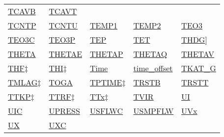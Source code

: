 \documentclass[
  english,
]{book}
\begin{document}
\begin{longtable}[]{@{}lllll@{}}
\href{./radiation-variables.html\#rstx}{TCAVB} &
\href{./radiation-variables.html\#rstx}{TCAVT} \\
\href{./aerosol-particle-measurements.html\#tcntu-tcntp}{TCNTP} &
\href{./aerosol-particle-measurements.html\#tcntu-tcntp}{TCNTU} &
\href{./aerosol-particle-measurements.html\#cntemp}{TEMP1} &
\href{./aerosol-particle-measurements.html\#cntemp}{TEMP2} &
\href{./air-chemistry-measurements.html\#te03}{TEO3} \\
\href{./air-chemistry-measurements.html\#te03c}{TEO3C} &
\href{./air-chemistry-measurements.html\#tep}{TEO3P} &
\href{./air-chemistry-measurements.html\#tep}{TEP} &
\href{./air-chemistry-measurements.html\#tet}{TET} &
\href{./the-state-of-the-aircraft.html\#thdg}{THDG}{]} \\
\href{./the-state-of-the-atmosphere.html\#theta}{THETA} &
\href{./the-state-of-the-atmosphere.html\#thetae}{THETAE} &
\href{./the-state-of-the-atmosphere.html\#thetae}{THETAP} &
\href{./the-state-of-the-atmosphere.html\#thetaq}{THETAQ} &
\href{./the-state-of-the-atmosphere.html\#thetav}{THETAV} \\
\href{./obsolete-variables.html\#thf}{THF\(\ddagger\)} &
\href{./obsolete-variables.html\#ltn51}{THI\(\ddagger\)} &
\href{./general-information-about-data-files.html\#time}{Time} &
\href{./general-information-about-data-files.html\#time-offset}{time\_offset}
& \href{./the-state-of-the-aircraft.html\#ggtrk}{TKAT\_G} \\
\href{./obsolete-variables.html\#tmlag}{TMLAG\(\ddagger\)} &
\href{./air-chemistry-measurements.html\#awas-cims-qcls-toga}{TOGA} &
\href{./obsolete-variables.html\#tptime}{TPTIME\(\ddagger\)} &
\href{./radiation-variables.html\#trstx}{TRSTB} &
\href{./radiation-variables.html\#trstx}{TRSTT} \\
\href{./obsolete-variables.html\#ttkp}{TTKP\(\ddagger\)} &
\href{./obsolete-variables.html\#ttrf}{TTRF\(\ddagger\)} &
\href{./obsolete-variables.html\#ttx}{TTx\(\ddagger\)} &
\href{./the-state-of-the-atmosphere.html\#TVIR}{TVIR} &
\href{./the-state-of-the-atmosphere.html\#ui-vi-wi}{UI} \\
\href{./the-state-of-the-atmosphere.html\#uic-vic}{UIC} &
\href{./aerosol-particle-measurements.html\#upress}{UPRESS} &
\href{./aerosol-particle-measurements.html\#pflw}{USFLWC} &
\href{./aerosol-particle-measurements.html\#pflw}{USMPFLW} &
\href{./obsolete-variables.html\#uvx}{UVx} \\
\href{./the-state-of-the-atmosphere.html\#ux-vy}{UX} &
\href{./the-state-of-the-atmosphere.html\#uxc-vyc}{UXC} &

\end{longtable}
\end{document}
